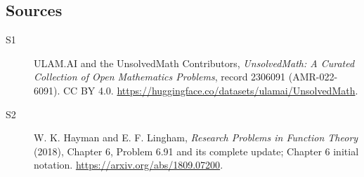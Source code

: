 \documentclass[11pt]{article}
\begin{document}
\subsection{Sources}
\begin{description}
\item[\hypertarget{source:2306091:1}{S1}] ULAM.AI and the UnsolvedMath Contributors, \emph{UnsolvedMath: A Curated Collection of Open Mathematics Problems}, record 2306091 (AMR-022-6091). CC BY 4.0. \url{https://huggingface.co/datasets/ulamai/UnsolvedMath}.
\item[\hypertarget{source:2306091:2}{S2}] W. K. Hayman and E. F. Lingham, \emph{Research Problems in Function Theory} (2018), Chapter 6, Problem 6.91 and its complete update; Chapter 6 initial notation. \url{https://arxiv.org/abs/1809.07200}.
\end{description}
\label{end:2306091}
\end{document}
